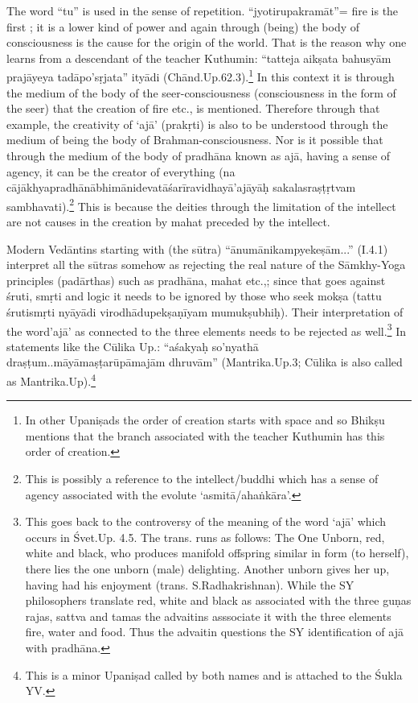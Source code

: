 The word “tu” is used in the sense of repetition. “jyotirupakramāt”= fire is the first ; it is a lower kind of power and again through (being) the body of consciousness is the cause for the origin of the world. That is the reason why one learns from a descendant of the teacher Kuthumin: “tatteja aikṣata bahusyām prajāyeya tadāpo’sṛjata” ityādi (Chānd.Up.62.3).\footnote{In other Upaniṣads the order of creation starts with  space and so Bhikṣu  mentions that the branch associated with the teacher Kuthumin has this order of creation.} In this context it is through the medium of the body of the seer-consciousness (consciousness in the form of the seer) that the creation of fire etc., is mentioned. Therefore through that example, the creativity of ‘ajā’ (prakṛti) is also to be understood through the medium of being the body of Brahman-consciousness.  Nor is it possible that through the medium of the body of pradhāna known as ajā, having a sense of agency, it can be the creator of everything (na cājākhyapradhānābhimānidevatāśarīravidhayā’ajāyāḥ sakalasraṣṭṛtvam sambhavati).\footnote{This is possibly a reference to the intellect/buddhi which has a sense of agency associated with the evolute ‘asmitā/ahaṅkāra’.} This is because the deities through the limitation of the intellect are not causes in the creation by mahat preceded by the intellect.

Modern Vedāntins starting with (the sūtra) “ānumānikampyekeṣām...” (I.4.1)  interpret all the sūtras somehow as rejecting the real nature of the Sāmkhy-Yoga principles (padārthas) such as pradhāna, mahat etc.,; since that goes against śruti, smṛti and logic it needs to be ignored by those who seek mokṣa (tattu śrutismṛti nyāyādi virodhādupekṣaṇī\-yam mumukṣubhiḥ). Their interpretation of the word’ajā’ as connected to the three elements needs to be rejected as well.\footnote{This goes back to the controversy of the meaning of the word ‘ajā’ which occurs in Śvet.Up. 4.5. The trans. runs as follows: The One Unborn, red, white and black, who produces manifold offspring similar in form (to herself), there lies the one unborn (male) delighting. Another unborn gives her up, having had his enjoyment (trans. S.Radhakrishnan). While the SY philosophers translate red, white and black as associated with the three guṇas rajas, sattva and tamas the advaitins asssociate it with the three elements fire, water and food. Thus the advaitin questions the SY identification of ajā with pradhāna.} In statements like the Cūlika Up.: “aśakyaḥ so’nyathā draṣṭum..māyāmaṣṭarūpāmajām dhruvām” (Mantrika.Up.3; Cūlika is also called as Mantrika.Up).\footnote{This is a minor Upaniṣad called by both names and is attached to the Śukla YV.}


